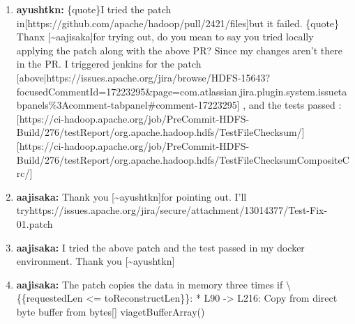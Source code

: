 \documentclass{report}%
\begin{document}
\begin{enumerate}
\begin{spverbatim}
\end{spverbatim}\ %
\item%
\textbf{ayushtkn: }\{quote\}I tried the patch in{[}https://github.com/apache/hadoop/pull/2421/files{]}but it failed.\newline%
\newline%
\{quote\}\newline%
\newline%
Thanx {[}\textasciitilde{}aajisaka{]}for trying out, do you mean to say you tried locally applying the patch along with the above PR? Since my changes aren't there in the PR.\newline%
\newline%
\newline%
\newline%
I triggered jenkins for the patch {[}above|https://issues.apache.org/jira/browse/HDFS{-}15643?focusedCommentId=17223295\&page=com.atlassian.jira.plugin.system.issuetabpanels\%3Acomment{-}tabpanel\#comment{-}17223295{]} , and the tests passed :\newline%
\newline%
\newline%
\newline%
{[}https://ci{-}hadoop.apache.org/job/PreCommit{-}HDFS{-}Build/276/testReport/org.apache.hadoop.hdfs/TestFileChecksum/{]}\newline%
\newline%
\newline%
\newline%
{[}https://ci{-}hadoop.apache.org/job/PreCommit{-}HDFS{-}Build/276/testReport/org.apache.hadoop.hdfs/TestFileChecksumCompositeCrc/{]}\newline%
\newline%
\newline%
\newline%
%
\item%
\textbf{aajisaka: }Thank you {[}\textasciitilde{}ayushtkn{]}for pointing out. I'll tryhttps://issues.apache.org/jira/secure/attachment/13014377/Test{-}Fix{-}01.patch%
\item%
\textbf{aajisaka: }I tried the above patch and the test passed in my docker environment. Thank you {[}\textasciitilde{}ayushtkn{]}%
\item%
\textbf{aajisaka: }The patch copies the data in memory three times if \textbackslash{}\{\{requestedLen <= toReconstructLen\}\}:\newline%
\newline%
 * L90 {-}> L216: Copy from direct byte buffer from bytes{[}{]} viagetBufferArray()\newline%

\end{enumerate}
\end{document}
